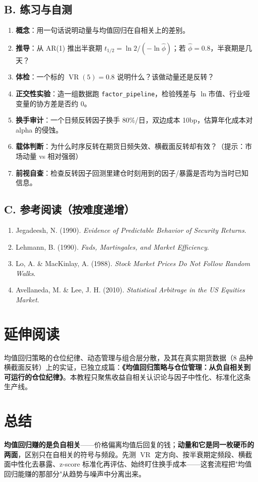 \documentclass[UTF8,11pt]{ctexart}
\newcommand{\codeinl}[1]{\texttt{#1}}
\begin{document}
\subsection*{B. 练习与自测}
\begin{enumerate}[itemsep=2pt]
\item \textbf{概念}：用一句话说明动量与均值回归在自相关上的差别。
\item \textbf{推导}：从 AR(1) 推出半衰期 $t_{1/2}=\ln2/(-\ln\hat\phi)$；若 $\hat\phi=0.8$，半衰期是几天？
\item \textbf{体检}：一个标的 $\operatorname{VR}(5)=0.8$ 说明什么？该做动量还是反转？
\item \textbf{正交性实验}：造一组数据跑 \codeinl{factor\_pipeline}，检验残差与 $\ln$市值、行业哑变量的协方差是否约 0。
\item \textbf{换手审计}：一个日频反转因子换手 80\%/日，双边成本 10bp，估算年化成本对 alpha 的侵蚀。
\item \textbf{载体判断}：为什么时序反转在期货日频失效、横截面反转却有效？（提示：市场动量 vs 相对强弱）
\item \textbf{前视自查}：检查反转因子回测里建仓时刻用到的因子/暴露是否均为当时已知信息。
\end{enumerate}

\subsection*{C. 参考阅读（按难度递增）}
\begin{enumerate}[itemsep=2pt]
\item Jegadeesh, N. (1990). \emph{Evidence of Predictable Behavior of Security Returns}.
\item Lehmann, B. (1990). \emph{Fads, Martingales, and Market Efficiency}.
\item Lo, A. \& MacKinlay, A. (1988). \emph{Stock Market Prices Do Not Follow Random Walks}.
\item Avellaneda, M. \& Lee, J. H. (2010). \emph{Statistical Arbitrage in the US Equities Market}.
\end{enumerate}

\section*{延伸阅读}
均值回归策略的仓位纪律、动态管理与组合层分散，及其在真实期货数据（8 品种横截面反转）上的实证，已独立成篇：\textbf{《均值回归策略与仓位管理：从负自相关到可运行的仓位纪律》}。本教程只聚焦收益自相关认识论与因子中性化、标准化这条生产线。

\section*{总结}
\textbf{均值回归赚的是负自相关}——价格偏离均值后回复的钱；\textbf{动量和它是同一枚硬币的两面}，区别只在自相关的符号与频段。先测 $\operatorname{VR}$ 定方向、按半衰期定频段、横截面中性化去暴露、z-score 标准化再评估、始终盯住换手成本——这套流程把"均值回归能赚的那部分"从趋势与噪声中分离出来。
\end{document}
